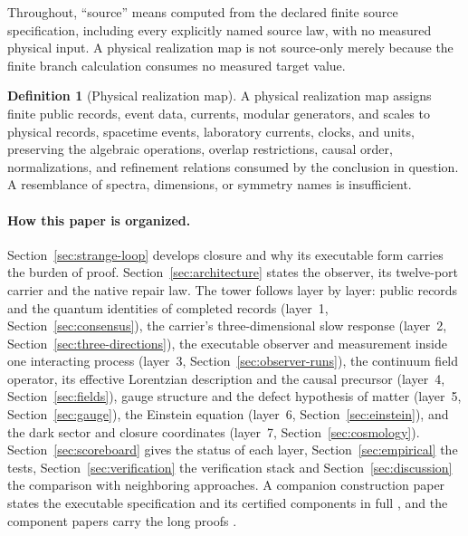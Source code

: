 \documentclass[11pt]{article}
\theoremstyle{definition}
\newtheorem{definition}[theorem]{Definition}
\theoremstyle{remark}
\begin{document}
Throughout, ``source'' means computed from the declared finite source
specification, including every explicitly named source law, with no measured
physical input. A physical realization map is not source-only merely because the finite branch calculation consumes no measured target value.

\begin{definition}[Physical realization map]
\label{def:physical-realization}
A physical realization map assigns finite public records, event data,
currents, modular generators, and scales to physical records, spacetime
events, laboratory currents, clocks, and units, preserving the algebraic
operations, overlap restrictions, causal order, normalizations, and
refinement relations consumed by the conclusion in question. A resemblance
of spectra, dimensions, or symmetry names is insufficient.
\end{definition}

\paragraph{How this paper is organized.}
Section~\ref{sec:strange-loop} develops closure and why its executable form
carries the burden of proof. Section~\ref{sec:architecture} states the
observer, its twelve-port carrier and the native repair law. The tower
follows layer by layer: public records and the quantum identities of
completed records (layer~1, Section~\ref{sec:consensus}), the carrier's
three-dimensional slow response (layer~2, Section~\ref{sec:three-directions}),
the executable observer and measurement inside one interacting process
(layer~3, Section~\ref{sec:observer-runs}), the continuum field operator,
its effective Lorentzian description and the causal precursor (layer~4,
Section~\ref{sec:fields}), gauge structure and the defect hypothesis of
matter (layer~5, Section~\ref{sec:gauge}), the Einstein equation (layer~6,
Section~\ref{sec:einstein}), and the dark sector and closure coordinates
(layer~7, Section~\ref{sec:cosmology}). Section~\ref{sec:scoreboard} gives
the status of each layer, Section~\ref{sec:empirical} the tests,
Section~\ref{sec:verification} the verification stack and
Section~\ref{sec:discussion} the comparison with neighboring approaches. A
companion construction paper states the executable specification and its
certified components in full \cite{ophspine}, and the component papers carry
the long proofs
\cite{ophrepo,ophnormalforms,opheventalgebra,ophconsensus,ophobservers,ophGauge,ophEinstein,ophMicrophysics,ophsim}.
\end{document}
